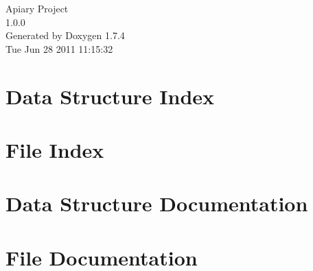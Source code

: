 \documentclass[a4paper]{book}
\begin{document}
\hypersetup{pageanchor=false}
\begin{titlepage}
\vspace*{7cm}
\begin{center}
{\Large Apiary Project \\[1ex]\large 1.0.0 }\\
\vspace*{1cm}
{\large Generated by Doxygen 1.7.4}\\
\vspace*{0.5cm}
{\small Tue Jun 28 2011 11:15:32}\\
\end{center}
\end{titlepage}
\clearemptydoublepage
{}
\tableofcontents
\clearemptydoublepage
{}
\hypersetup{pageanchor=true}
\chapter{Data Structure Index}

\chapter{File Index}

\chapter{Data Structure Documentation}



\chapter{File Documentation}















\printindex
\end{document}
